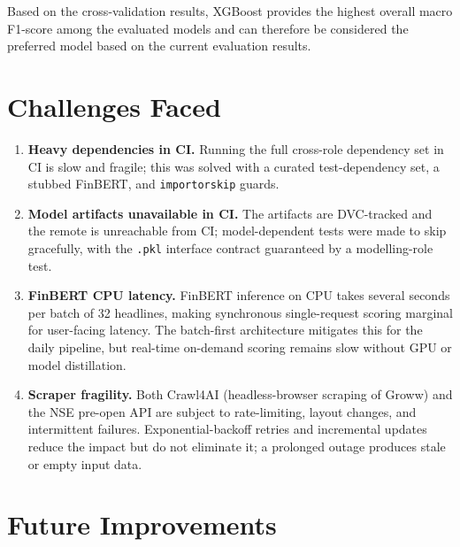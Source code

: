 \documentclass[11pt,a4paper]{article}
\begin{document}
Based on the cross-validation results, XGBoost provides the highest overall
macro F1-score among the evaluated models and can therefore be considered the
preferred model based on the current evaluation results.


\section{Challenges Faced}
\label{sec:challenges}

\begin{enumerate}


  \item \textbf{Heavy dependencies in CI.} Running the full cross-role
        dependency set in CI is slow and fragile; this was solved with a curated
        test-dependency set, a stubbed FinBERT, and \texttt{importorskip} guards.

  \item \textbf{Model artifacts unavailable in CI.} The artifacts are
        DVC-tracked and the remote is unreachable from CI; model-dependent tests
        were made to skip gracefully, with the \texttt{.pkl} interface contract
        guaranteed by a modelling-role test.

  \item \textbf{FinBERT CPU latency.} FinBERT inference on CPU takes several
        seconds per batch of 32 headlines, making synchronous single-request
        scoring marginal for user-facing latency. The batch-first architecture
        mitigates this for the daily pipeline, but real-time on-demand scoring
        remains slow without GPU or model distillation.


  \item \textbf{Scraper fragility.} Both Crawl4AI (headless-browser scraping of
        Groww) and the NSE pre-open API are subject to rate-limiting, layout
        changes, and intermittent failures. Exponential-backoff retries and
        incremental updates reduce the impact but do not eliminate it;
        a prolonged outage produces stale or empty input data.
\end{enumerate}


\section{Future Improvements}
\label{sec:future}
\end{document}
